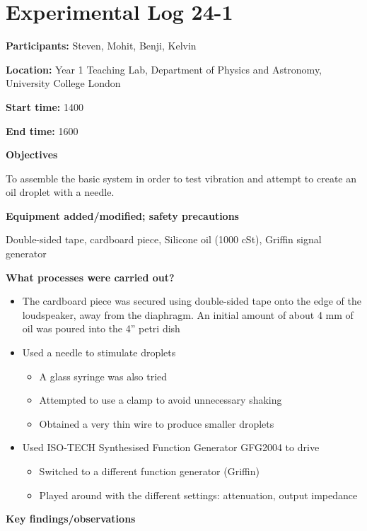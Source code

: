 
\section{Experimental Log 24-1}

\textbf{Participants:} Steven, Mohit, Benji, Kelvin

\textbf{Location:} Year 1 Teaching Lab, Department of Physics and Astronomy, University College London

\textbf{Start time:} 1400

\textbf{End time:} 1600
\bigskip

\textbf{Objectives}

To assemble the basic system in order to test vibration and attempt to create an oil droplet with a needle.
\bigskip

\textbf{Equipment added/modified; safety precautions}

Double-sided tape, cardboard piece, Silicone oil (1000 cSt), Griffin signal generator
\bigskip

\textbf{What processes were carried out?}

\begin{itemize}
\item The cardboard piece was secured using double-sided tape onto the edge of the loudspeaker, away from the diaphragm. An initial amount of about 4 mm of oil was poured into the 4'' petri dish
\item Used a needle to stimulate droplets

\begin{itemize}
\item A glass syringe was also tried
\item Attempted to use a clamp to avoid unnecessary shaking
\item Obtained a very thin wire to produce smaller droplets
\end{itemize}
\item Used ISO-TECH Synthesised Function Generator GFG2004 to drive 

\begin{itemize}
\item Switched to a different function generator (Griffin)
\item Played around with the different settings: attenuation, output impedance
\end{itemize}
\end{itemize}
\bigskip

\textbf{Key findings/observations}


